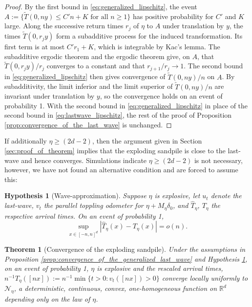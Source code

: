 \documentclass[aap]{imsart}
\newcommand{\R}{\mathbb{R}}
\newtheorem{theorem}{Theorem}[section]
\newtheorem{hyp}{Hypothesis}
\begin{document}
\begin{proof}
	By the first bound in \eqref{eq:generalized_lipschitz}, the event $A := \{ \tilde{T}(0,ny) \leq C' n + K \mbox{ for all } n \geq 1\}$ has positive probability for $C'$ and $K$ large. Along the successive return times $r_j$ of $\eta$ to $A$ under translation by $y$, the times $\tilde{T}(0, r_j y)$ form a subadditive process for the induced transformation. Its first term is at most $C' r_1 + K$, which is integrable by Kac's lemma. The subadditive ergodic theorem and the ergodic theorem give, on $A$, that $\tilde{T}(0, r_j y)/r_j$ converges to a constant and that $r_{j+1}/r_j \to 1$. The second bound in \eqref{eq:generalized_lipschitz} then gives convergence of $\tilde{T}(0,ny)/n$ on $A$. By subadditivity, the limit inferior and the limit superior of $\tilde{T}(0,ny)/n$ are invariant under translation by $y$, so the convergence holds on an event of probability 1. With the second bound in \eqref{eq:generalized_lipschitz} in place of the second bound in \eqref{eq:lastwave_lipschitz}, the rest of the proof of Proposition \ref{prop:convergence_of_the_last_wave} is unchanged.
\end{proof}

If additionally $\eta \geq (2 d - 2)$, then the argument given in Section \ref{sec:proof_of_theorem} implies that the exploding
sandpile is close to the last-wave and hence converges. Simulations indicate $\eta \geq (2d - 2)$ is not necessary, however, we have not found an alternative condition and are forced to assume this: 

\begin{hyp}[Wave-approximation] \label{hyp:wave_approximation}
	Suppose $\eta$ is explosive, let $u_t$ denote the last-wave, $v_t$ the parallel toppling odometer for $\eta + M_{\eta}  \delta_0$,
	and $\hat{T}_{\eta}$, $T_{\eta}$ the respective arrival times. On an event of probability 1, 
	\[
	\sup_{x \in [-n,n]^d} |\hat{T}_{\eta}(x)- T_{\eta}(x)| = o(n).
	\]
\end{hyp}


\begin{theorem}[Convergence of the exploding sandpile]
	Under the assumptions in Proposition \ref{prop:convergence_of_the_generalized_last_wave} and Hypothesis \ref{hyp:wave_approximation},
	on an event of probability 1, $\eta$ is explosive and the rescaled arrival times, $n^{-1} T_{\eta}([nx]) := n^{-1} \min \{ t > 0 : v_t([nx]) > 0\}$ converge locally uniformly to $\mathcal{N}_{\eta}$, a deterministic, continuous, convex, one-homogeneous function on $\R^d$
	depending only on the law of $\eta$.
\end{theorem}
\end{document}
